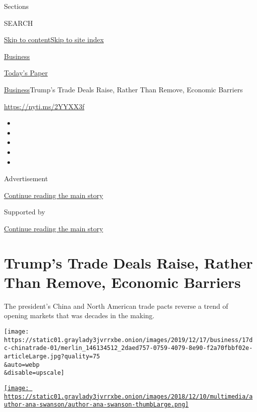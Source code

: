 Sections

SEARCH

\protect\hyperlink{site-content}{Skip to
content}\protect\hyperlink{site-index}{Skip to site index}

\href{https://www.nytimes3xbfgragh.onion/section/business}{Business}

\href{https://myaccount.nytimes3xbfgragh.onion/auth/login?response_type=cookie\&client_id=vi}{}

\href{https://www.nytimes3xbfgragh.onion/section/todayspaper}{Today's
Paper}

\href{/section/business}{Business}\textbar{}Trump's Trade Deals Raise,
Rather Than Remove, Economic Barriers

\href{https://nyti.ms/2YYXX3f}{https://nyti.ms/2YYXX3f}

\begin{itemize}
\item
\item
\item
\item
\item
\end{itemize}

Advertisement

\protect\hyperlink{after-top}{Continue reading the main story}

Supported by

\protect\hyperlink{after-sponsor}{Continue reading the main story}

\hypertarget{trumps-trade-deals-raise-rather-than-remove-economic-barriers}{%
\section{Trump's Trade Deals Raise, Rather Than Remove, Economic
Barriers}\label{trumps-trade-deals-raise-rather-than-remove-economic-barriers}}

The president's China and North American trade pacts reverse a trend of
opening markets that was decades in the making.

\texttt{[image: https://static01.graylady3jvrrxbe.onion/images/2019/12/17/business/17dc-chinatrade-01/merlin\_146134512\_2daed757-0759-4079-8e90-f2a70fbbf02e-articleLarge.jpg?quality=75\\\&auto=webp\\\&disable=upscale]}

\href{https://www.nytimes3xbfgragh.onion/by/ana-swanson}{\texttt{[image: https://static01.graylady3jvrrxbe.onion/images/2018/12/10/multimedia/author-ana-swanson/author-ana-swanson-thumbLarge.png]}}


